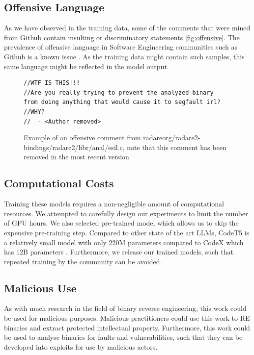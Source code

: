 \subsection{Offensive Language}
As we have observed in the training data, some of the comments that were mined from Github contain insulting or discriminatory statements \ref{fig:offensive}. The prevalence of offensive language in Software Engineering communities such as Github is a known issue \cite{OffensiveLanguage}. As the training data might contain such samples, this same language might be reflected in the model output. 
\label{fig:offensive}
\begin{figure}[H]
  \centering
\begin{lstlisting}
//WTF IS THIS!!!
//Are you really trying to prevent the analyzed binary 
from doing anything that would cause it to segfault irl?
//WHY?
//	- <Author removed>
\end{lstlisting}
  \caption{Example of an offensive comment from radareorg/radare2-bindings/radare2/libr/anal/esil.c, note that this comment has been removed in the most recent version}
\end{figure}


\subsection{Computational Costs}
Training these models requires a non-negligible amount of computational resources. We attempted to carefully design our experiments to limit the number of GPU hours. We also selected pre-trained model which allows us to skip the expensive pre-training step. Compared to other state of the art LLMs, CodeT5 is a relatively small model with only 220M parameters compared to CodeX which has 12B parameters \cite{CodeX}. Furthermore, we release our trained models, such that repeated training by the community can be avoided.

\subsection{Malicious Use}
As with much research in the field of binary reverse engineering, this work could be used for malicious purposes. Malicious practitioners could use this work to RE binaries and extract protected intellectual property. Furthermore, this work could be used to analyse binaries for faults and vulnerabilities, such that they can be developed into exploits for use by malicious actors.
